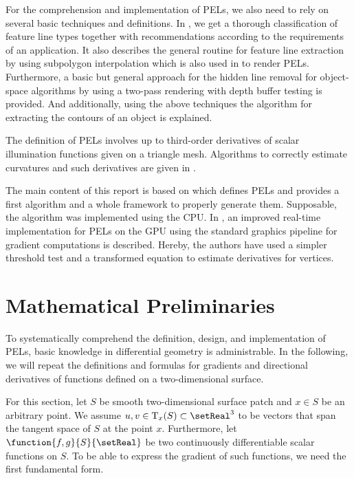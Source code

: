 \documentclass[9pt,fleqn,twoside,twocolumn]{stdglobal}
\begin{document}
  For the comprehension and implementation of PELs, we also need to rely on several basic techniques and definitions.
  In \textcite{isenberg2003}, we get a thorough classification of feature line types together with recommendations according to the requirements of an application.
  It also describes the general routine for feature line extraction by using subpolygon interpolation which is also used in \textcite{zhang2010} to render PELs.
  Furthermore, a basic but general approach for the hidden line removal for object-space algorithms by using a two-pass rendering with depth buffer testing is provided.
  And additionally, using the above techniques the algorithm for extracting the contours of an object is explained.
  \autocite{isenberg2003}

  The definition of PELs involves up to third-order derivatives of scalar illumination functions given on a triangle mesh.
  Algorithms to correctly estimate curvatures and such derivatives are given in \textcite{rusinkiewicz2004}.

  The main content of this report is based on \textcite{xie2007} which defines PELs and provides a first algorithm and a whole framework to properly generate them.
  Supposable, the algorithm was implemented using the CPU.
  In \textcite{zhang2010}, an improved real-time implementation for PELs on the GPU using the standard graphics pipeline for gradient computations is described.
  Hereby, the authors have used a simpler threshold test and a transformed equation to estimate derivatives for vertices.


\section{Mathematical Preliminaries}
\label{sec:mathematical-preliminaries}
  To systematically comprehend the definition, design, and implementation of PELs, basic knowledge in differential geometry is administrable.
  In the following, we will repeat the definitions and formulas for gradients and directional derivatives of functions defined on a two-dimensional surface.

  For this section, let $S$ be smooth two-dimensional surface patch and $x\in S$ be an arbitrary point.
  We assume $u,v\in\mathrm{T}_x(S)\subset\setReal^3$ to be vectors that span the tangent space of $S$ at the point $x$.
  Furthermore, let $\function{f,g}{S}{\setReal}$ be two continuously differentiable scalar functions on $S$.
  To be able to express the gradient of such functions, we need the first fundamental form.
\end{document}
